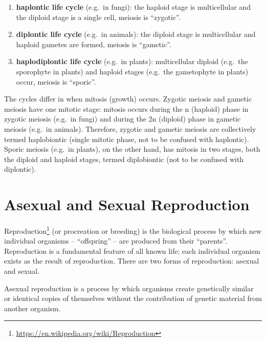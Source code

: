 \documentclass[]{book}
\providecommand{\tightlist}{%
  \setlength{\itemsep}{0pt}\setlength{\parskip}{0pt}}
\let\rmarkdownfootnote\footnote%
\def\footnote{\protect\rmarkdownfootnote}
\renewcommand{\href}[2]{#2\footnote{\url{#1}}}
\theoremstyle{definition}
\theoremstyle{definition}
\theoremstyle{definition}
\theoremstyle{remark}
\begin{document}
\begin{enumerate}
\begin{enumerate}
\def\labelenumi{\arabic{enumi}.}
\tightlist
\item
  \textbf{haplontic life cycle} (e.g.~in fungi): the haploid stage is
  multicellular and the diploid stage is a single cell, meiosis is
  ``zygotic''.
\item
  \textbf{diplontic life cycle} (e.g.~in animals): the diploid stage is
  multicellular and haploid gametes are formed, meiosis is ``gametic''.
\item
  \textbf{haplodiplontic life cycle} (e.g.~in plants): multicellular
  diploid (e.g.~the sporophyte in plants) and haploid stages (e.g.~the
  gametophyte in plants) occur, meiosis is ``sporic''.
\end{enumerate}

The cycles differ in when mitosis (growth) occurs. Zygotic meiosis and
gametic meiosis have one mitotic stage: mitosis occurs during the n
(haploid) phase in zygotic meiosis (e.g.~in fungi) and during the 2n
(diploid) phase in gametic meiosis (e.g.~in animals). Therefore, zygotic
and gametic meiosis are collectively termed haplobiontic (single mitotic
phase, not to be confused with haplontic). Sporic meiosis (e.g.~in
plants), on the other hand, has mitosis in two stages, both the diploid
and haploid stages, termed diplobiontic (not to be confused with
diplontic).

\section{Asexual and Sexual
Reproduction}\label{asexual-and-sexual-reproduction}

\href{https://en.wikipedia.org/wiki/Reproduction}{Reproduction} (or
procreation or breeding) is the biological process by which new
individual organisms -- ``offspring'' -- are produced from their
``parents''. Reproduction is a fundamental feature of all known life;
each individual organism exists as the result of reproduction. There are
two forms of reproduction: asexual and sexual.

Asexual reproduction is a process by which organisms create genetically
similar or identical copies of themselves without the contribution of
genetic material from another organism.


\end{enumerate}
\end{document}
